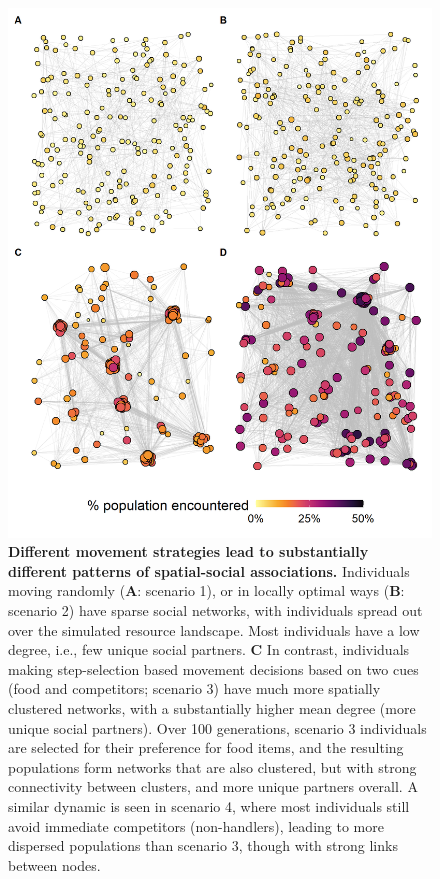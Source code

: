 \begin{interludeenv}
\begin{figure}[p]
    \centering
    \includegraphics[width=0.9\linewidth]{figures/introduction/fig_networks.png}
    \caption{
        \textbf{Different movement strategies lead to substantially different patterns of spatial-social associations.}
        Individuals moving randomly (\textbf{A}: scenario 1), or in locally optimal ways (\textbf{B}: scenario 2) have sparse social networks, with individuals spread out over the simulated resource landscape.
        Most individuals have a low degree, i.e., few unique social partners.
        \textbf{C} In contrast, individuals making step-selection based movement decisions based on two cues (food and competitors; scenario 3) have much more spatially clustered networks, with a substantially higher mean degree (more unique social partners).
        Over 100 generations, scenario 3 individuals are selected for their preference for food items, and the resulting populations form networks that are also clustered, but with strong connectivity between clusters, and more unique partners overall.
        A similar dynamic is seen in scenario 4, where most individuals still avoid immediate competitors (non-handlers), leading to more dispersed populations than scenario 3, though with strong links between nodes.
    }
    \label{fig:demo_networks}
  \end{figure}


\end{interludeenv}
